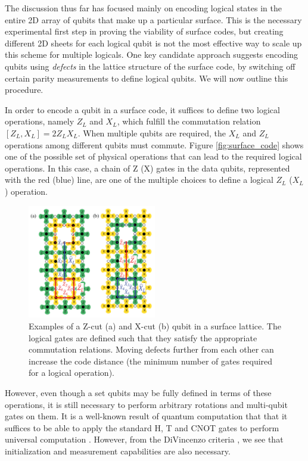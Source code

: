 The discussion thus far has focused mainly on encoding logical states in the
entire 2D array of qubits that make up a particular surface. This is the
necessary experimental first step in proving the viability of surface codes, but
creating different 2D sheets for each logical qubit is not the most effective
way to scale up this scheme for multiple logicals. One key candidate approach
suggests encoding qubits using \textit{defects} in the lattice structure of the
surface code, by switching off certain parity measurements to define logical
qubits. We will now outline this procedure.

In order to encode a qubit in a surface code, it suffices to define two logical
operations, namely $Z_L$ and $X_L$, which fulfill the commutation relation
$[Z_L,X_L] = 2Z_LX_L$. When multiple qubits are required, the $X_L$ and $Z_L$
operations among different qubits must commute. Figure \ref{fig:surface_code}
shows one of the possible set of physical operations that can lead to the
required logical operations. In this case, a chain of Z (X) gates in the data
qubits, represented with the red (blue) line, are one of the multiple choices to
define a logical $Z_L$ ($X_L$) operation.

\begin{figure}[htbp]
  \centering
  \includegraphics[width=0.5\textwidth]{images/surface_code_cuts.pdf}
  \caption{Examples of a Z-cut (a) and X-cut (b) qubit in a surface lattice. The
    logical gates are defined such that they satisfy the appropriate commutation
    relations. Moving defects further from each other can increase the code
    distance (the minimum number of gates required for a logical operation).}
  \label{fig:cuts}
\end{figure}

However, even though a set qubits may be fully defined in terms of these
operations, it is still necessary to perform arbitrary rotations and multi-qubit
gates on them. It is a well-known result of quantum computation that that it
suffices to be able to apply the standard H, T and CNOT gates to perform
universal computation \cite{nielsen_chuang_2010}. However, from the DiVincenzo
criteria \cite{DiCincenzoCriteria}, we see that initialization and
measurement capabilities are also necessary.

